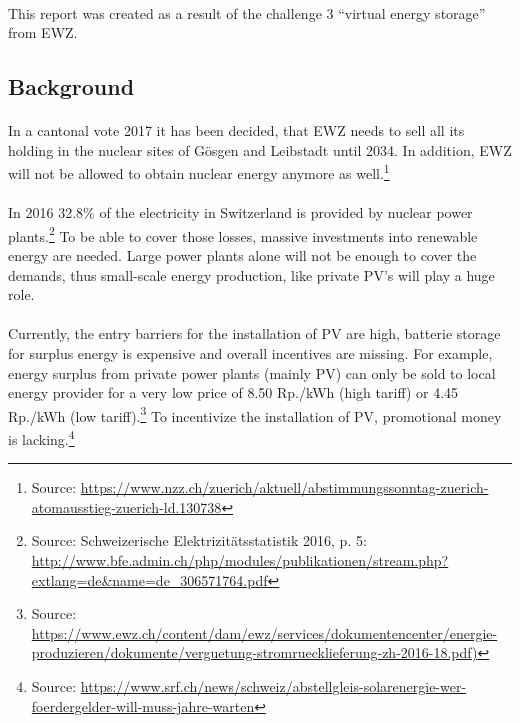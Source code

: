 \documentclass{scrartcl}
\begin{document}
	\paragraph{}
	This report was created as a result of the challenge 3 “virtual energy storage” from EWZ.
	
	\subsection{Background}
	
	\paragraph{}
	In a cantonal vote 2017 it has been decided, that EWZ needs to sell all its holding in the nuclear sites of Gösgen and Leibstadt until 2034. In addition, EWZ will not be allowed to obtain nuclear energy anymore as well.\footnote{Source: \url{https://www.nzz.ch/zuerich/aktuell/abstimmungssonntag-zuerich-atomausstieg-zuerich-ld.130738}}
	
	\paragraph{}
	In 2016 32.8\% of the electricity in Switzerland is provided by nuclear power plants.\footnote{Source: Schweizerische Elektrizitätsstatistik 2016, p. 5: \url{http://www.bfe.admin.ch/php/modules/publikationen/stream.php?extlang=de\&name=de_306571764.pdf}} To be able to cover those losses, massive investments into renewable energy are needed. Large power plants alone will not be enough to cover the demands, thus small-scale energy production, like private PV's will play a huge role.
	
	\paragraph{}
	Currently, the entry barriers for the installation of PV are high, batterie storage for surplus energy is expensive and overall incentives are missing. For example, energy surplus from private power plants (mainly PV) can only be sold to local energy provider for a very low price of 8.50 Rp./kWh (high tariff) or 4.45 Rp./kWh (low tariff).\footnote{Source: \url{https://www.ewz.ch/content/dam/ewz/services/dokumentencenter/energie-produzieren/dokumente/verguetung-stromruecklieferung-zh-2016-18.pdf)}} To incentivize the installation of PV, promotional money is lacking.\footnote{Source: \url{https://www.srf.ch/news/schweiz/abstellgleis-solarenergie-wer-foerdergelder-will-muss-jahre-warten}}
\end{document}
